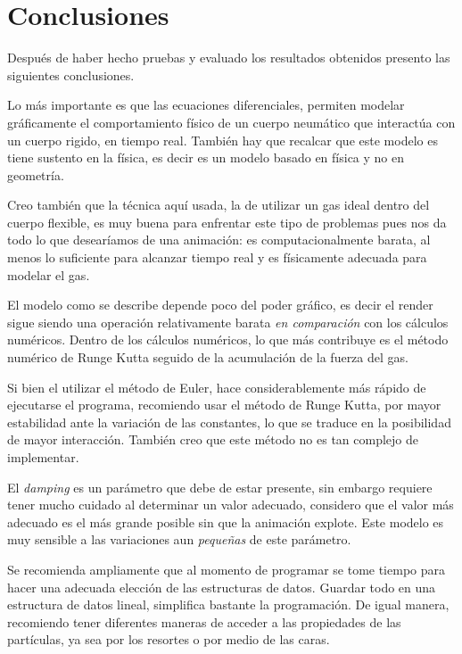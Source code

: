 \chapter*{Conclusiones}

Después de haber hecho pruebas y evaluado los resultados obtenidos presento las siguientes conclusiones.

Lo más importante es que las ecuaciones diferenciales, permiten modelar gráficamente el comportamiento físico de un cuerpo neumático que interactúa con un cuerpo rigido, en tiempo real.
También hay que recalcar que este modelo es tiene sustento en la física, es decir es un modelo basado en física y no en geometría.

Creo también que la técnica aquí usada, la de utilizar un gas ideal dentro del cuerpo flexible, es muy buena para enfrentar este tipo de problemas pues nos da todo lo que desearíamos de una animación: es computacionalmente barata, al menos lo suficiente para alcanzar tiempo real y es físicamente adecuada para modelar el gas.

El modelo como se describe depende poco del poder gráfico, es decir el render sigue siendo una operación relativamente barata \emph{en comparación} con los cálculos numéricos.
Dentro de los cálculos numéricos, lo que más contribuye es el método numérico de Runge Kutta seguido de la acumulación de la fuerza del gas.

Si bien el utilizar el método de Euler, hace considerablemente más rápido de ejecutarse el programa, recomiendo usar el método de Runge Kutta, por mayor estabilidad ante la variación de las constantes, lo que se traduce en la posibilidad de mayor interacción.
También creo que este método no es tan complejo de implementar.

El \emph{\foreignlanguage{english}{damping}} es un parámetro que debe de estar presente, sin embargo requiere tener mucho cuidado al determinar un valor adecuado, considero que el valor más adecuado es el más grande posible sin que la animación explote.
Este modelo es muy sensible a las variaciones aun \emph{pequeñas} de este parámetro.

Se recomienda ampliamente que al momento de programar se tome tiempo para hacer una adecuada elección de las estructuras de datos.
Guardar todo en una estructura de datos lineal, simplifica bastante la programación. De igual manera, recomiendo tener diferentes maneras de acceder a las propiedades de las partículas, ya sea por los resortes o por medio de las caras.

